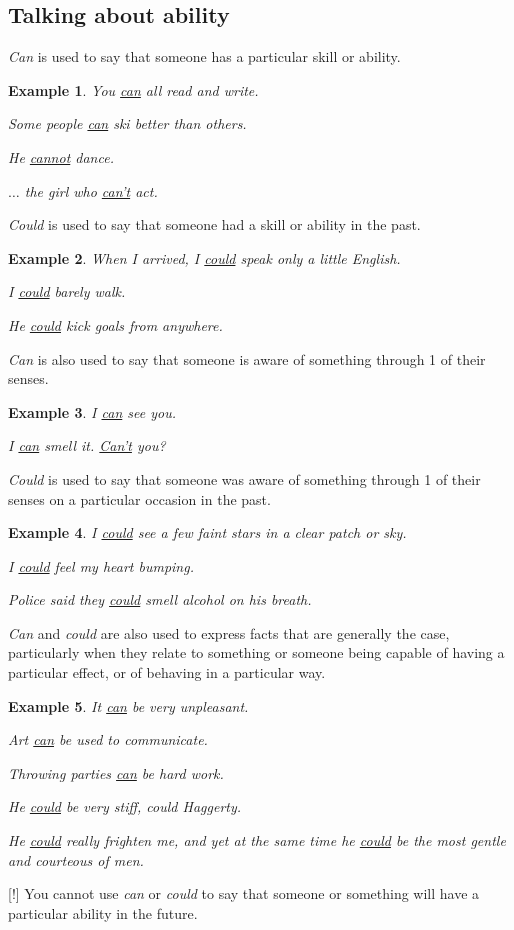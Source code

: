 \documentclass[oneside]{book}
\numberwithin{equation}{section}
\newtheorem{example}{Example}[section]
\begin{document}
\subsection{Talking about ability}
\noindent{} \textit{Can} is used to say that someone has a particular skill or ability.
\begin{example}
    You \underline{can} all read and write.
    
    Some people \underline{can} ski better than others.
    
    He \underline{cannot} dance.
    
    $\ldots$ the girl who \underline{can't} act.
\end{example}
\textit{Could} is used to say that someone had a skill or ability in the past.
\begin{example}
    When I arrived, I \underline{could} speak only a little English.
    
    I \underline{could} barely walk.
    
    He \underline{could} kick goals from anywhere.
\end{example}
%
\noindent{} \textit{Can} is also used to say that someone is aware of something through 1 of their senses.
\begin{example}
    I \underline{can} see you.
    
    I \underline{can} smell it. \underline{Can't} you?
\end{example}
\textit{Could} is used to say that someone was aware of something through 1 of their senses on a particular occasion in the past.
\begin{example}
    I \underline{could} see a few faint stars in a clear patch or sky.
    
    I \underline{could} feel my heart bumping.
    
    Police said they \underline{could} smell alcohol on his breath.
\end{example}
%
\noindent{} \textit{Can} and \textit{could} are also used to express facts that are generally the case, particularly when they relate to something or someone being capable of having a particular effect, or of behaving in a particular way.
\begin{example}
    It \underline{can} be very unpleasant.
    
    Art \underline{can} be used to communicate.
    
    Throwing parties \underline{can} be hard work.
    
    He \underline{could} be very stiff, could Haggerty.
    
    He \underline{could} really frighten me, and yet at the same time he \underline{could} be the most gentle and courteous of men.
\end{example}
%
\noindent{} [!] You cannot use \textit{can} or \textit{could} to say that someone or something will have a particular ability in the future.
\end{document}

